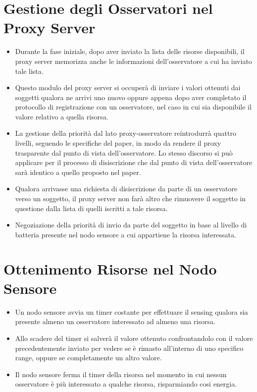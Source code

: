   \section{Gestione degli Osservatori nel Proxy Server}

    \begin{itemize}
      \item Durante la fase iniziale, dopo aver inviato la lista delle risorse disponibili, il proxy server memorizza anche le informazioni dell’osservatore a cui ha inviato tale lista.
      \item Questo modulo del proxy server si occuperà di inviare i valori ottenuti dai soggetti qualora ne arrivi uno nuovo oppure appena dopo aver completato il protocollo di registrazione con un osservatore, nel caso in cui sia disponibile il valore relativo a quella risorsa.
      \item La gestione della priorità dal lato proxy-osservatore reintrodurrà quattro livelli, seguendo le specifiche del paper, in modo da rendere il proxy trasparente dal punto di vista dell’osservatore. Lo stesso discorso si può applicare per il processo di disiscrizione che dal punto di vista dell’osservatore sarà identico a quello proposto nel paper.
      \item Qualora arrivasse una richiesta di disiscrizione da parte di un osservatore verso un soggetto, il proxy server non farà altro che rimuovere il soggetto in questione dalla lista di quelli iscritti a tale risorsa.
      \item Negoziazione della priorità di invio da parte del soggetto in base al livello di batteria presente nel nodo sensore a cui appartiene la risorsa interessata.
    \end{itemize}

  \section{Ottenimento Risorse nel Nodo Sensore}

    \begin{itemize}
      \item Un nodo sensore avvia un timer costante per effettuare il sensing qualora sia presente almeno un osservatore interessato ad almeno una risorsa.
      \item Allo scadere del timer si salverà il valore ottenuto confrontandolo con il valore precedentemente inviato per vedere se è rimasto all’interno di uno specifico range, oppure se completamente un altro valore.
      \item Il nodo sensore ferma il timer della risorsa nel momento in cui nessun osservatore è più interessato a qualche risorsa, risparmiando cosi energia.
    \end{itemize}

